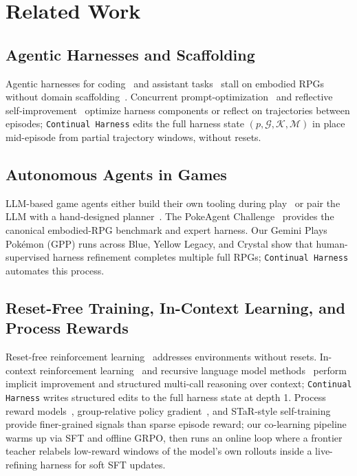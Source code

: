 \section{Related Work}\label{sec:related_work}

\subsection{Agentic Harnesses and Scaffolding}

Agentic harnesses for coding~\citep{anthropic2025claudecode, wang2024openhands, steinberger2025openclaw} and assistant tasks~\citep{nousresearch2026hermes} stall on embodied RPGs without domain scaffolding~\citep{karten2026pokeagent}. Concurrent prompt-optimization~\citep{agrawal2025gepa, opsahl2024optimizing, lee2026meta} and reflective self-improvement~\citep{shinn2023reflexion, madaan2023self} optimize harness components or reflect on trajectories between episodes; \texttt{Continual Harness} edits the full harness state $(p, \mathcal{G}, \mathcal{K}, \mathcal{M})$ in place mid-episode from partial trajectory windows, without resets.

\subsection{Autonomous Agents in Games}

LLM-based game agents either build their own tooling during play~\citep{wang2023voyager, anthropic2025claudeplays} or pair the LLM with a hand-designed planner~\citep{karten2025pok}. The PokeAgent Challenge~\citep{karten2026pokeagent} provides the canonical embodied-RPG benchmark and expert harness. Our Gemini Plays Pok\'emon (GPP) runs across Blue, Yellow Legacy, and Crystal show that human-supervised harness refinement completes multiple full RPGs; \texttt{Continual Harness} automates this process.

\subsection{Reset-Free Training, In-Context Learning, and Process Rewards}

Reset-free reinforcement learning~\citep{gupta2021reset} addresses environments without resets. In-context reinforcement learning~\citep{song2025reward, karten2025llm} and recursive language model methods~\citep{zhang2025recursive, yao2022react} perform implicit improvement and structured multi-call reasoning over context; \texttt{Continual Harness} writes structured edits to the full harness state at depth 1. Process reward models~\citep{wang2026openclawrl, lightman2023let}, group-relative policy gradient~\citep{shao2024deepseekmath}, and STaR-style self-training~\citep{zelikman2022star} provide finer-grained signals than sparse episode reward; our co-learning pipeline warms up via SFT and offline GRPO, then runs an online loop where a frontier teacher relabels low-reward windows of the model's own rollouts inside a live-refining harness for soft SFT updates.
